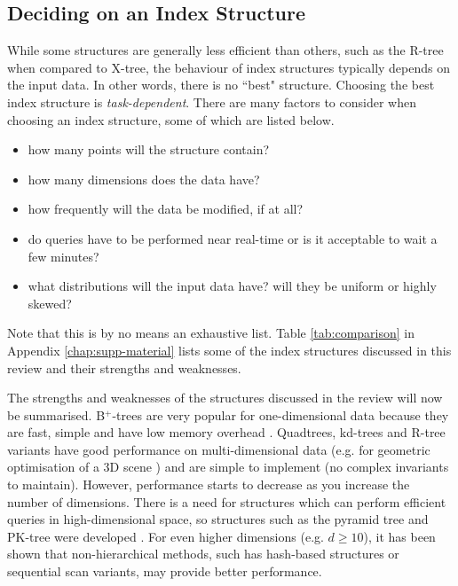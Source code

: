 \subsection{Deciding on an Index Structure}
\label{sec:structure-decision}

While some structures are generally less efficient than others, such as the R-tree when compared to X-tree, the behaviour of index structures typically depends on the input data. In other words, there is no ``best" structure. Choosing the best index structure is \textit{task-dependent}. There are many factors to consider when choosing an index structure, some of which are listed below.
\begin{itemize}
	\item how many points will the structure contain?
	\item how many dimensions does the data have?
	\item how frequently will the data be modified, if at all?
	\item do queries have to be performed near real-time or is it acceptable to wait a few minutes?
	\item what distributions will the input data have? will they be uniform or highly skewed?
\end{itemize}

Note that this is by no means an exhaustive list. Table \ref{tab:comparison} in Appendix \ref{chap:supp-material} lists some of the index structures discussed in this review and their strengths and weaknesses.

The strengths and weaknesses of the structures discussed in the review will now be summarised. B${}^{+}$-trees are very popular for one-dimensional data because they are fast, simple and have low memory overhead \cite{ubiquitous-btree}. Quadtrees, kd-trees and R-tree variants have good performance on multi-dimensional data (e.g. for geometric optimisation of a 3D scene \cite{kd-tree-gpu}) and are simple to implement (no complex invariants to maintain). However, performance starts to decrease as you increase the number of dimensions. There is a need for structures which can perform efficient queries in high-dimensional space, so structures such as the pyramid tree and PK-tree were developed \cite{pk-tree, pyramid-tree}. For even higher dimensions (e.g. $d \geq 10$), it has been shown that non-hierarchical methods, such has hash-based structures or sequential scan variants, may provide better performance.